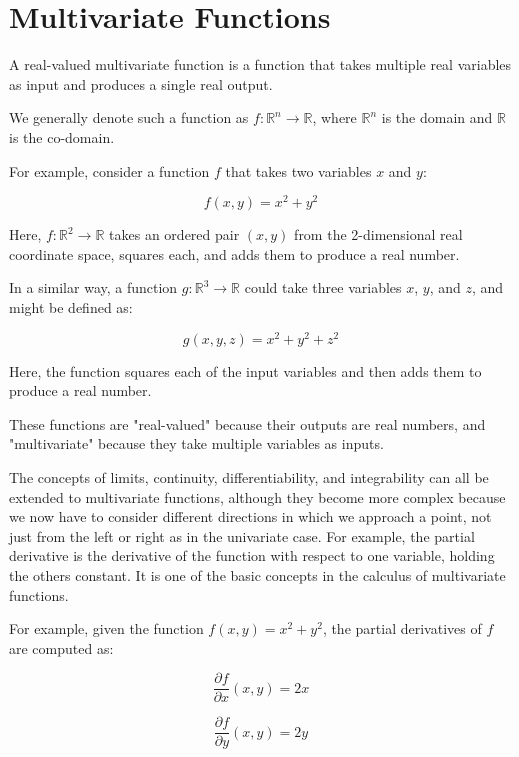 \chapter{Multivariate Functions}

A real-valued multivariate function is a function that takes multiple
real variables as input and produces a single real output.

We generally denote such a function as $f: \mathbb{R}^n \rightarrow
\mathbb{R}$, where $\mathbb{R}^n$ is the domain and $\mathbb{R}$ is
the co-domain.

For example, consider a function $f$ that takes two variables $x$ and
$y$:

\begin{equation*}
f(x, y) = x^2 + y^2
\end{equation*}

Here, $f: \mathbb{R}^2 \rightarrow \mathbb{R}$ takes an ordered pair
$(x, y)$ from the 2-dimensional real coordinate space, squares each,
and adds them to produce a real number.

In a similar way, a function $g: \mathbb{R}^3 \rightarrow \mathbb{R}$
could take three variables $x$, $y$, and $z$, and might be defined as:

\begin{equation*}
g(x, y,z) = x^2 + y^2 + z^2
\end{equation*}

Here, the function squares each of the input variables and then adds
them to produce a real number.

These functions are "real-valued" because their outputs are real
numbers, and "multivariate" because they take multiple variables as
inputs.

The concepts of limits, continuity, differentiability, and
integrability can all be extended to multivariate functions, although
they become more complex because we now have to consider different
directions in which we approach a point, not just from the left or
right as in the univariate case. For example, the partial derivative
is the derivative of the function with respect to one variable,
holding the others constant. It is one of the basic concepts in the
calculus of multivariate functions.

For example, given the function $f(x, y) = x^2 + y^2$, the partial
derivatives of $f$ are computed as:

\begin{equation*}
\frac{\partial f}{\partial x}(x, y) = 2x
\end{equation*}

\begin{equation*}
\frac{\partial f}{\partial y}(x, y) = 2y
\end{equation*}

